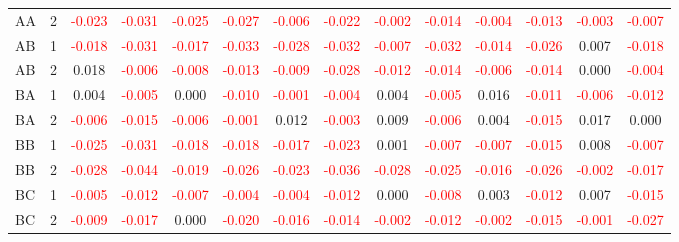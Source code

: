 \begin{table}[H]
{\begin{tabular}{llcccccccccccc}
AA & 2 & \textcolor{red}{-0.023} & \textcolor{red}{-0.031} & \textcolor{red}{-0.025} & \textcolor{red}{-0.027} & \textcolor{red}{-0.006} & \textcolor{red}{-0.022} & \textcolor{red}{-0.002} & \textcolor{red}{-0.014} & \textcolor{red}{-0.004} & \textcolor{red}{-0.013} & \textcolor{red}{-0.003} & \textcolor{red}{-0.007}\\
AB & 1 & \textcolor{red}{-0.018} & \textcolor{red}{-0.031} & \textcolor{red}{-0.017} & \textcolor{red}{-0.033} & \textcolor{red}{-0.028} & \textcolor{red}{-0.032} & \textcolor{red}{-0.007} & \textcolor{red}{-0.032} & \textcolor{red}{-0.014} & \textcolor{red}{-0.026} & 0.007 & \textcolor{red}{-0.018}\\
AB & 2 & 0.018 & \textcolor{red}{-0.006} & \textcolor{red}{-0.008} & \textcolor{red}{-0.013} & \textcolor{red}{-0.009} & \textcolor{red}{-0.028} & \textcolor{red}{-0.012} & \textcolor{red}{-0.014} & \textcolor{red}{-0.006} & \textcolor{red}{-0.014} & 0.000 & \textcolor{red}{-0.004}\\
BA & 1 & 0.004 & \textcolor{red}{-0.005} & 0.000 & \textcolor{red}{-0.010} & \textcolor{red}{-0.001} & \textcolor{red}{-0.004} & 0.004 & \textcolor{red}{-0.005} & 0.016 & \textcolor{red}{-0.011} & \textcolor{red}{-0.006} & \textcolor{red}{-0.012}\\
BA & 2 & \textcolor{red}{-0.006} & \textcolor{red}{-0.015} & \textcolor{red}{-0.006} & \textcolor{red}{-0.001} & 0.012 & \textcolor{red}{-0.003} & 0.009 & \textcolor{red}{-0.006} & 0.004 & \textcolor{red}{-0.015} & 0.017 & 0.000\\
BB & 1 & \textcolor{red}{-0.025} & \textcolor{red}{-0.031} & \textcolor{red}{-0.018} & \textcolor{red}{-0.018} & \textcolor{red}{-0.017} & \textcolor{red}{-0.023} & 0.001 & \textcolor{red}{-0.007} & \textcolor{red}{-0.007} & \textcolor{red}{-0.015} & 0.008 & \textcolor{red}{-0.007}\\
BB & 2 & \textcolor{red}{-0.028} & \textcolor{red}{-0.044} & \textcolor{red}{-0.019} & \textcolor{red}{-0.026} & \textcolor{red}{-0.023} & \textcolor{red}{-0.036} & \textcolor{red}{-0.028} & \textcolor{red}{-0.025} & \textcolor{red}{-0.016} & \textcolor{red}{-0.026} & \textcolor{red}{-0.002} & \textcolor{red}{-0.017}\\
BC & 1 & \textcolor{red}{-0.005} & \textcolor{red}{-0.012} & \textcolor{red}{-0.007} & \textcolor{red}{-0.004} & \textcolor{red}{-0.004} & \textcolor{red}{-0.012} & 0.000 & \textcolor{red}{-0.008} & 0.003 & \textcolor{red}{-0.012} & 0.007 & \textcolor{red}{-0.015}\\
BC & 2 & \textcolor{red}{-0.009} & \textcolor{red}{-0.017} & 0.000 & \textcolor{red}{-0.020} & \textcolor{red}{-0.016} & \textcolor{red}{-0.014} & \textcolor{red}{-0.002} & \textcolor{red}{-0.012} & \textcolor{red}{-0.002} & \textcolor{red}{-0.015} & \textcolor{red}{-0.001} & \textcolor{red}{-0.027}\\
\hline
    \end{tabular}%
    }
    \label{tab:cen9_cov}
\end{table}
